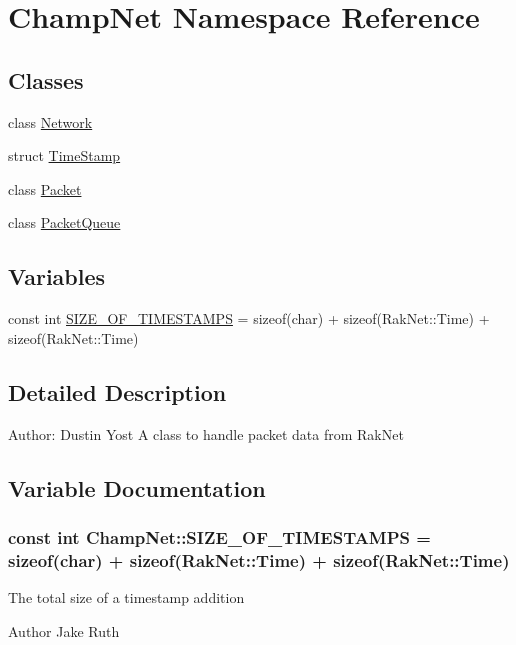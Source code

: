 \hypertarget{namespace_champ_net}{\section{Champ\-Net Namespace Reference}
\label{namespace_champ_net}
}
\subsection*{Classes}
\begin{DoxyCompactItemize}
\item 
class \hyperlink{class_champ_net_1_1_network}{Network}
\item 
struct \hyperlink{struct_champ_net_1_1_time_stamp}{Time\-Stamp}
\item 
class \hyperlink{class_champ_net_1_1_packet}{Packet}
\item 
class \hyperlink{class_champ_net_1_1_packet_queue}{Packet\-Queue}
\end{DoxyCompactItemize}
\subsection*{Variables}
\begin{DoxyCompactItemize}
\item 
const int \hyperlink{namespace_champ_net_ae8bece8e869e20f234d9ae67256a735f}{S\-I\-Z\-E\-\_\-\-O\-F\-\_\-\-T\-I\-M\-E\-S\-T\-A\-M\-P\-S} = sizeof(char) + sizeof(Rak\-Net\-::\-Time) + sizeof(Rak\-Net\-::\-Time)
\end{DoxyCompactItemize}


\subsection{Detailed Description}
Author\-: Dustin Yost A class to handle packet data from Rak\-Net 

\subsection{Variable Documentation}
\hypertarget{namespace_champ_net_ae8bece8e869e20f234d9ae67256a735f}{
\subsubsection[{S\-I\-Z\-E\-\_\-\-O\-F\-\_\-\-T\-I\-M\-E\-S\-T\-A\-M\-P\-S}]{\setlength{\rightskip}{0pt plus 5cm}const int Champ\-Net\-::\-S\-I\-Z\-E\-\_\-\-O\-F\-\_\-\-T\-I\-M\-E\-S\-T\-A\-M\-P\-S = sizeof(char) + sizeof(Rak\-Net\-::\-Time) + sizeof(Rak\-Net\-::\-Time)}}\label{namespace_champ_net_ae8bece8e869e20f234d9ae67256a735f}
The total size of a timestamp addition \begin{DoxyAuthor}{Author}
Jake Ruth 
\end{DoxyAuthor}
